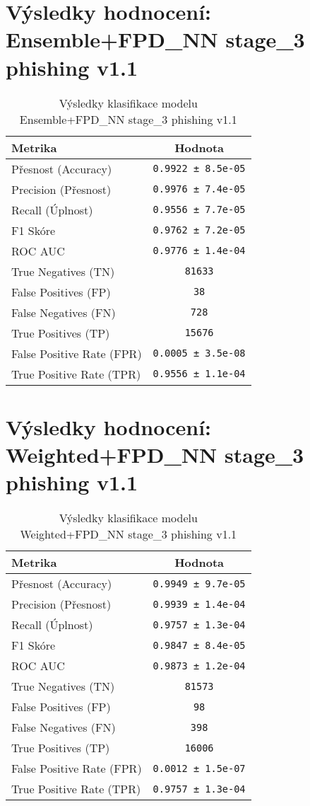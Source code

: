 \section*{Výsledky hodnocení: Ensemble+FPD_NN stage_3 phishing v1.1}
\begin{table}[h!]
\centering
\begin{tabular}{|l|c|}
\hline
\textbf{Metrika} & \textbf{Hodnota} \\
\hline
Přesnost (Accuracy) & \texttt{0.9922 ± 8.5e-05} \\
Precision (Přesnost) & \texttt{0.9976 ± 7.4e-05} \\
Recall (Úplnost) & \texttt{0.9556 ± 7.7e-05} \\
F1 Skóre & \texttt{0.9762 ± 7.2e-05} \\
ROC AUC & \texttt{0.9776 ± 1.4e-04} \\
True Negatives (TN) & \texttt{81633} \\
False Positives (FP) & \texttt{38} \\
False Negatives (FN) & \texttt{728} \\
True Positives (TP) & \texttt{15676} \\
False Positive Rate (FPR) & \texttt{0.0005 ± 3.5e-08} \\
True Positive Rate (TPR) & \texttt{0.9556 ± 1.1e-04} \\
\hline
\end{tabular}
\caption{Výsledky klasifikace modelu Ensemble+FPD_NN stage_3 phishing v1.1}
\label{tab:phishing_ensemble+fpd_nn}
\end{table}

\section*{Výsledky hodnocení: Weighted+FPD_NN stage_3 phishing v1.1}
\begin{table}[h!]
\centering
\begin{tabular}{|l|c|}
\hline
\textbf{Metrika} & \textbf{Hodnota} \\
\hline
Přesnost (Accuracy) & \texttt{0.9949 ± 9.7e-05} \\
Precision (Přesnost) & \texttt{0.9939 ± 1.4e-04} \\
Recall (Úplnost) & \texttt{0.9757 ± 1.3e-04} \\
F1 Skóre & \texttt{0.9847 ± 8.4e-05} \\
ROC AUC & \texttt{0.9873 ± 1.2e-04} \\
True Negatives (TN) & \texttt{81573} \\
False Positives (FP) & \texttt{98} \\
False Negatives (FN) & \texttt{398} \\
True Positives (TP) & \texttt{16006} \\
False Positive Rate (FPR) & \texttt{0.0012 ± 1.5e-07} \\
True Positive Rate (TPR) & \texttt{0.9757 ± 1.3e-04} \\
\hline
\end{tabular}
\caption{Výsledky klasifikace modelu Weighted+FPD_NN stage_3 phishing v1.1}
\label{tab:phishing_weighted+fpd_nn}
\end{table}

